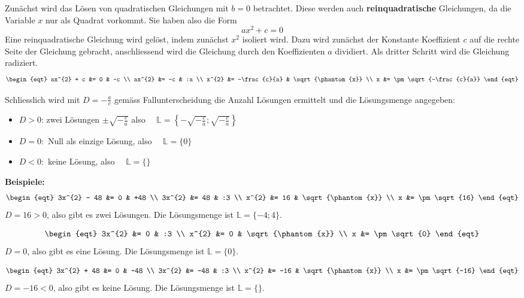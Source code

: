 Zunächst wird das Lösen von quadratischen Gleichungen mit $b = 0$ betrachtet. Diese werden auch \textbf{reinquadratische} Gleichungen, da die Variable $x$ nur als Quadrat vorkommt. Sie haben also die Form
\[
  ax^{2}+c = 0
\]
Eine reinquadratische Gleichung wird gelöst, indem zunächst $x^{2}$ isoliert wird. Dazu wird zunächst der Konstante Koeffizient $c$ auf die rechte Seite der Gleichung gebracht, anschliessend wird die Gleichung durch den Koeffizienten $a$ dividiert. Als dritter Schritt wird die Gleichung radiziert.
\[\def\arraystretch{2}\begin{eqt}
  ax^{2} + c &= 0            & -c \\
      ax^{2} &= -c           & :a \\
       x^{2} &= -\frac{c}{a} & \sqrt{\phantom{x}} \\
           x &= \pm\sqrt{-\frac{c}{a}}
\end{eqt}\]

Schliesslich wird mit $D = -\frac{a}{c}$ gemäss Fallunterscheidung die Anzahl Lösungen ermittelt und die Lösungsmenge angegeben:
\begin{itemize}
\item $D > 0$: zwei Lösungen $\pm\sqrt{-\frac{c}{a}}$ also $\quad\mathbb{L} = \left\{-\sqrt{-\frac{c}{a}}; \sqrt{-\frac{c}{a}}\right\}$
\item $D = 0:$ Null als einzige Lösung, also $\quad\mathbb{L} = \{0\}$
\item $D < 0:$ keine Lösung, also $\quad\mathbb{L} = \{\}$
\end{itemize}

\begin{example}
  \textbf{Beispiele:}
  \[\begin{eqt}
    3x^{2} - 48 &= 0     & +48 \\
         3x^{2} &= 48    & :3  \\
          x^{2} &= 16    & \sqrt{\phantom{x}} \\
              x &= \pm \sqrt{16}
  \end{eqt}\]
  $D=16 > 0$, also gibt es zwei Lösungen. Die Lösungsmenge ist $\mathbb{L} = \{-4;4\}$.

  \[\begin{eqt}
         3x^{2} &= 0    & :3  \\
          x^{2} &= 0    & \sqrt{\phantom{x}} \\
              x &= \pm\sqrt{0}
  \end{eqt}\]
  $D=0$, also gibt es eine Lösung. Die Lösungsmenge ist $\mathbb{L} = \{0\}$.

  \[\begin{eqt}
    3x^{2} + 48 &= 0     & -48 \\
         3x^{2} &= -48   & :3  \\
          x^{2} &= -16   & \sqrt{\phantom{x}} \\
              x &= \pm \sqrt{-16}
  \end{eqt}\]
  $D=-16 < 0$, also gibt es keine Lösung. Die Lösungsmenge ist $\mathbb{L} = \{\}$.
\end{example}

